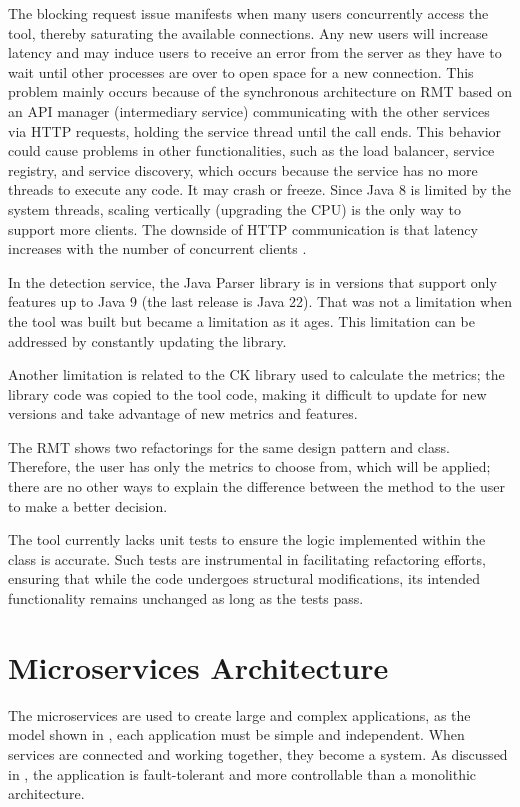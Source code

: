 The blocking request issue manifests when many users concurrently access the tool, thereby saturating the available connections. Any new users will increase latency and may induce users to receive an error from the server as they have to wait until other processes are over to open space for a new connection. This problem mainly occurs because of the synchronous architecture on RMT based on an API manager (intermediary service) communicating with the other services via HTTP requests, holding the service thread until the call ends. This behavior could cause problems in other functionalities, such as the load balancer, service registry, and service discovery, which occurs because the service has no more threads to execute any code. It may crash or freeze. Since Java 8 is limited by the system threads, scaling vertically (upgrading the CPU) is the only way to support more clients. The downside of HTTP communication is that latency increases with the number of concurrent clients \cite{Cebeci2020DesignOA}. 

In the detection service, the Java Parser library \textcite{javaparser} is in versions that support only features up to Java 9 (the last release is Java 22). That was not a limitation when the tool was built but became a limitation as it ages. This limitation can be addressed by constantly updating the library.

Another limitation is related to the CK \textcite{ck} library used to calculate the metrics; the library code was copied to the tool code, making it difficult to update for new versions and take advantage of new metrics and features. 

The RMT shows two refactorings for the same design pattern and class. Therefore, the user has only the metrics to choose from, which will be applied; there are no other ways to explain the difference between the method to the user to make a better decision.

The tool currently lacks unit tests to ensure the logic implemented within the class is accurate. Such tests are instrumental in facilitating refactoring efforts, ensuring that while the code undergoes structural modifications, its intended functionality remains unchanged as long as the tests pass.

\section{Microservices Architecture}
\label{sec-microservices}
The microservices are used to create large and complex applications, as the model shown in , each application must be simple and independent. When services are connected and working together, they become a system. As discussed in \textcite{microservices-comuni}, the application is fault-tolerant and more controllable than a monolithic architecture.

